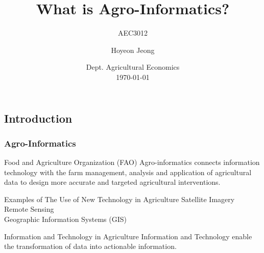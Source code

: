 \documentclass[
	11pt, %
]{beamer}
\title[What is Agro-Informatics?]{What is Agro-Informatics?} %
\subtitle{AEC3012} %
\author[Hoyeon Jeong]{Hoyeon Jeong} %
\institute[CNU]{Chonnam National University \\ \smallskip \textit{hjeong@jnu.ac.kr}} %
\date[\today]{Dept. Agricultural Economics \\ \today} %
\begin{document}

\begin{frame}
	\titlepage %
\end{frame}



\subsection{Introduction}
\begin{frame}
	\frametitle{Agro-Informatics}
	
	\begin{block}{Food and Agriculture Organization (FAO)}
		Agro-informatics connects information technology with the farm management, analysis and application of agricultural data to design more accurate and targeted agricultural interventions.
	\end{block}
	
	\begin{exampleblock}{Examples of The Use of New Technology in Agriculture}
		 Satellite Imagery \\ 
		 Remote Sensing \\ 
		 Geographic Information Systems (GIS) \\ 
	\end{exampleblock}
	
	\begin{block}{Information and Technology in Agriculture}
		Information and Technology enable the transformation of data into actionable information.
	\end{block}
\end{frame}
\end{document}
